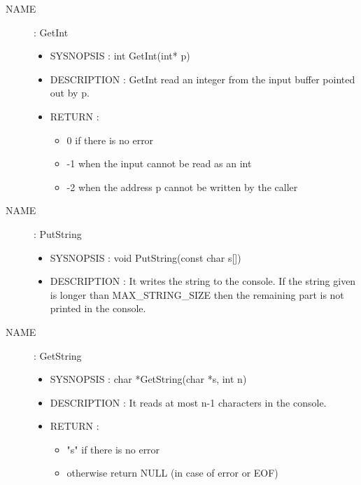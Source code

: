 \documentclass[a4paper,10pt]{article}
\begin{document}
\begin{description}
    \item [NAME] : GetInt
        \begin{itemize}
            \item SYSNOPSIS : int GetInt(int* p)
            \item DESCRIPTION :
                GetInt read an integer from the input buffer pointed out by p.
            \item RETURN :
                \begin{itemize}
                    \item 0 if there is no error
                    \item -1 when the input cannot be read as an int
                    \item -2 when the address p cannot be written by the caller
                \end{itemize}
        \end{itemize}

    \item [NAME] : PutString
        \begin{itemize}
            \item SYSNOPSIS : void PutString(const char s[])
            \item DESCRIPTION :
                It writes the string to the console. If the string given is longer than
                MAX\_STRING\_SIZE then the remaining part is not printed in the console.
        \end{itemize}

    \item [NAME] : GetString
        \begin{itemize}
            \item SYSNOPSIS : char *GetString(char *s, int n)
            \item DESCRIPTION :
                It reads at most n-1 characters in the console.
            \item RETURN :
                \begin{itemize}
                    \item "s" if there is no error
                    \item otherwise return NULL (in case of error or EOF)
                \end{itemize}
        \end{itemize}


\end{description}
\end{document}
